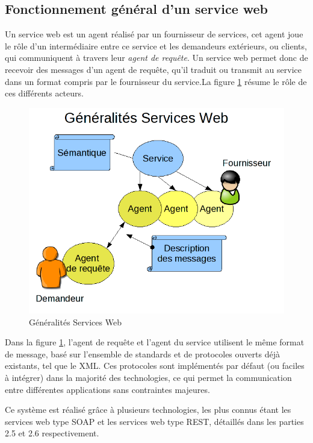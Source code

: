 \subsection{Fonctionnement général d'un service web}
Un service web est un agent réalisé par un fournisseur de services, cet agent joue le rôle d'un intermédiaire entre ce service et les demandeurs extérieurs, ou clients, qui communiquent à travers leur \emph{agent de requête}. 
\newline			
Un service web permet donc de recevoir des messages d'un agent de requête, qu'il traduit ou transmit au service dans un format compris par le fournisseur du service.\newline La figure \ref{Generalite_figure} résume le rôle de ces différents acteurs.
\begin{figure}[h]
	\center
	\includegraphics[scale=0.5]{img/Whatisaserviceweb.png}
	\caption{Généralités Services Web}		
	\label{Generalite_figure}
	\centering
\end{figure}						
\newline
Dans la figure \ref{Generalite_figure}, l'agent de requête et l'agent du service utilisent le même format de message, basé sur l'ensemble de standards et de protocoles ouverts déjà existants, tel que le XML.
Ces protocoles sont implémentés par défaut (ou faciles à intégrer) dans la majorité des technologies, ce qui permet la communication entre différentes applications sans contraintes majeures. 
	
Ce système est réalisé grâce à plusieurs technologies, les plus connus étant les services web type SOAP et les services web type REST, détaillés dans les parties 2.5 et 2.6 respectivement.
	

